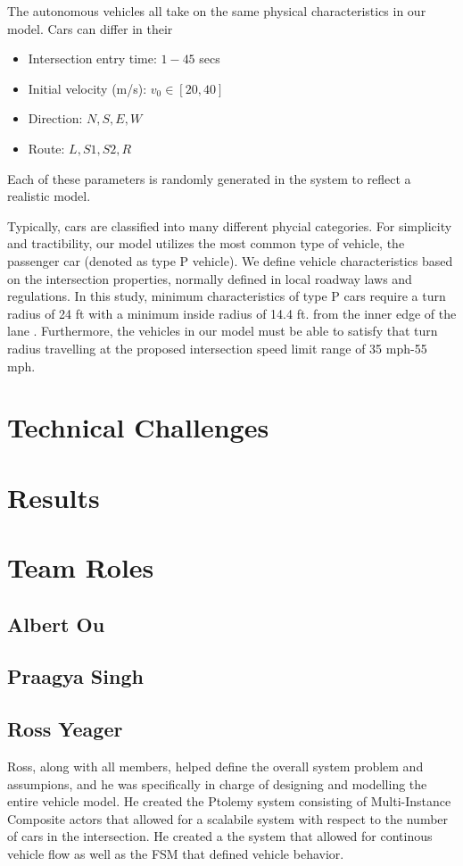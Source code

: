 \documentclass[10pt]{article}
\begin{document}
The autonomous vehicles all take on the same physical characteristics in our model.  Cars can differ in their
\begin{itemize}
\item Intersection entry time: $1-45$ secs
\item Initial velocity (m/s): $v_0 \in [20,40]$
\item Direction: $N,S,E,W$
\item Route: $L,S1,S2,R$
\end{itemize}

Each of these parameters is randomly generated in the system to reflect a realistic model.

Typically, cars are classified into many different phycial categories.  
For simplicity and tractibility, our model utilizes the most common type of vehicle, the passenger car (denoted as type P vehicle).  
We define vehicle characteristics based on the intersection properties, normally defined in local roadway laws and regulations.  In this study, minimum characteristics of type P cars require a turn radius of 24 ft with a minimum inside radius of 14.4 ft. from the inner edge of the lane \cite{Bureau}.  
Furthermore, the vehicles in our model must be able to satisfy that turn radius travelling at the proposed intersection speed limit range of 35 mph-55 mph. 


\section{Technical Challenges}

\section{Results}

\section{Team Roles}

\subsection{Albert Ou}

\subsection{Praagya Singh}

\subsection{Ross Yeager}
Ross, along with all members, helped define the overall system problem and assumpions, and he was specifically in charge of designing and modelling the entire vehicle model.  
He created the Ptolemy system consisting of Multi-Instance Composite actors that allowed for a scalabile system with respect to the number of cars in the intersection.  
He created a the system that allowed for continous vehicle flow as well as the FSM that defined vehicle behavior.
\end{document}
